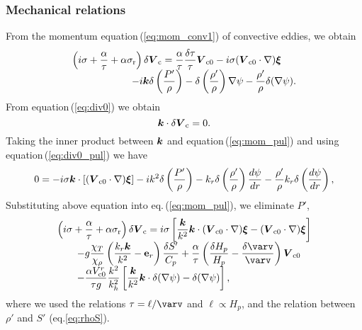 \documentclass[fleqn,usenatbib]{mnras}
\def\bm#1{\mbox{\boldmath$#1$}}
\begin{document}
\subsubsection{Mechanical relations}
From the momentum equation\,(\ref{eq:mom_conv1}) of convective eddies, we obtain
\begin{equation}
\begin{array}{l} \displaystyle
\left(i\sigma+{\alpha\over\tau}+\alpha\sigma_{\rm r}\right)\delta\bm{V}_{\rm c}  
= {\alpha\over\tau}{\delta\tau\over\tau}\bm{V}_{{\rm c}0}- i\sigma(\bm{V}_{{\rm c}0}\cdot\nabla)\bm{\xi}
 \cr \displaystyle \qquad \qquad \qquad
 -i\bm{k}\delta\left(P'\over\rho\right) 
 - \delta\left({\rho'\over\rho}\right)\nabla\psi
 -{\rho'\over\rho}\delta(\nabla\psi).
\end{array}
\label{eq:mom_pul}
\end{equation}
From equation\,(\ref{eq:div0}) we obtain
\begin{equation}
\bm{k}\cdot\delta\bm{V}_{\rm c}=0.
\label{eq:div0_pul}
\end{equation} 
Taking the inner product between $\bm{k}$ and equation\,(\ref{eq:mom_pul})
and using equation\,(\ref{eq:div0_pul}) we have
\begin{equation}
0=- i\sigma\bm{k}\cdot\left[(\bm{V}_{{\rm c}0}\cdot\nabla)\bm{\xi}\right]
 -ik^2\delta\left(P'\over\rho\right) 
 - k_r\delta\left({\rho'\over\rho}\right){d\psi\over dr}
 -{\rho'\over\rho}k_r\delta\left({d\psi\over dr}\right),
\end{equation}
Substituting above equation into eq.\,(\ref{eq:mom_pul}), we eliminate $P'$,
\begin{equation}
\begin{array}{ll}\displaystyle
\left(i\sigma+{\alpha\over\tau}+\alpha\sigma_{\rm r}\right)\delta\bm{V}_{\rm c} 
=i\sigma\left[{\bm{k}\over k^2}\bm{k}\cdot(\bm{V}_{\rm c0}\cdot\nabla)\bm{\xi}
 -(\bm{V}_{\rm c0}\cdot\nabla)\bm{\xi}\right] 
 \cr\displaystyle  \qquad
-g{\chi_T\over\chi_\rho}
\left({k_r\bm{k}\over k^2}-{\bf e}_r\right){\delta S'\over C_p}
+{\alpha\over\tau}\left({\delta H_p\over H_p}
-{\delta\varv\over\varv}\right)\bm{V}_{\rm c0} 
  \cr\displaystyle  \qquad
-{\alpha V_{\rm c0}^r\over\tau g}{k^2\over k_h^2} 
\left[{\bm{k}\over k^2}\bm{k}\cdot\delta(\nabla\psi)
 -\delta(\nabla\psi)\right],
\end{array}
\label{eq:deltV}
\end{equation}
where we used the relations 
$\tau = \ell/\varv$ \rm and $\ell \propto H_p$, 
and the relation between $\rho'$ and $S'$ (eq.\ref{eq:rhoS}).
\end{document}

